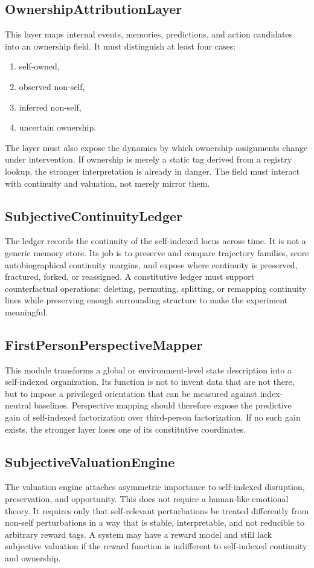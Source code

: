 \documentclass[11pt,a4paper]{article}
\theoremstyle{definition}
\begin{document}
\subsection{OwnershipAttributionLayer}
This layer maps internal events, memories, predictions, and action candidates into an ownership field. It must distinguish at least four cases:
\begin{enumerate}[leftmargin=1.5em]
\item self-owned,
\item observed non-self,
\item inferred non-self,
\item uncertain ownership.
\end{enumerate}
The layer must also expose the dynamics by which ownership assignments change under intervention. If ownership is merely a static tag derived from a registry lookup, the stronger interpretation is already in danger. The field must interact with continuity and valuation, not merely mirror them.

\subsection{SubjectiveContinuityLedger}
The ledger records the continuity of the self-indexed locus across time. It is not a generic memory store. Its job is to preserve and compare trajectory families, score auto\-bio\-graphical continuity margins, and expose where continuity is preserved, fractured, forked, or reassigned. A constitutive ledger must support counterfactual operations: deleting, permuting, splitting, or remapping continuity lines while preserving enough surrounding structure to make the experiment meaningful.

\subsection{FirstPersonPerspectiveMapper}
This module transforms a global or environment-level state description into a self-indexed organization. Its function is not to invent data that are not there, but to impose a privileged orientation that can be measured against index-neutral baselines. Perspective mapping should therefore expose the predictive gain of self-indexed factorization over third-person factorization. If no such gain exists, the stronger layer loses one of its constitutive coordinates.

\subsection{SubjectiveValuationEngine}
The valuation engine attaches asymmetric importance to self-indexed disruption, preservation, and opportunity. This does not require a human-like emotional theory. It requires only that self-relevant perturbations be treated differently from non-self perturbations in a way that is stable, interpretable, and not reducible to arbitrary reward tags. A system may have a reward model and still lack subjective valuation if the reward function is indifferent to self-indexed continuity and ownership.
\end{document}
